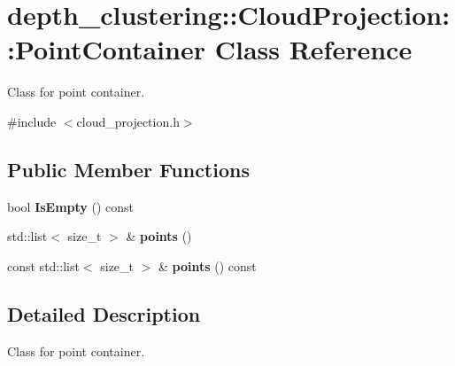 \hypertarget{classdepth__clustering_1_1CloudProjection_1_1PointContainer}{}\section{depth\+\_\+clustering\+:\+:Cloud\+Projection\+:\+:Point\+Container Class Reference}
\label{classdepth__clustering_1_1CloudProjection_1_1PointContainer}


Class for point container.  




{\ttfamily \#include $<$cloud\+\_\+projection.\+h$>$}

\subsection*{Public Member Functions}
\begin{DoxyCompactItemize}
\item 
\mbox{\label{classdepth__clustering_1_1CloudProjection_1_1PointContainer_a7881aeaed1ef6b6b9b9799faf2415232}} 
bool {\bfseries Is\+Empty} () const
\item 
\mbox{\label{classdepth__clustering_1_1CloudProjection_1_1PointContainer_a181d55691ad407d84c9dadbdbb4d3553}} 
std\+::list$<$ size\+\_\+t $>$ \& {\bfseries points} ()
\item 
\mbox{\label{classdepth__clustering_1_1CloudProjection_1_1PointContainer_aed8a1c55c1b22017d1799b21e58729e7}} 
const std\+::list$<$ size\+\_\+t $>$ \& {\bfseries points} () const
\end{DoxyCompactItemize}


\subsection{Detailed Description}
Class for point container. 

